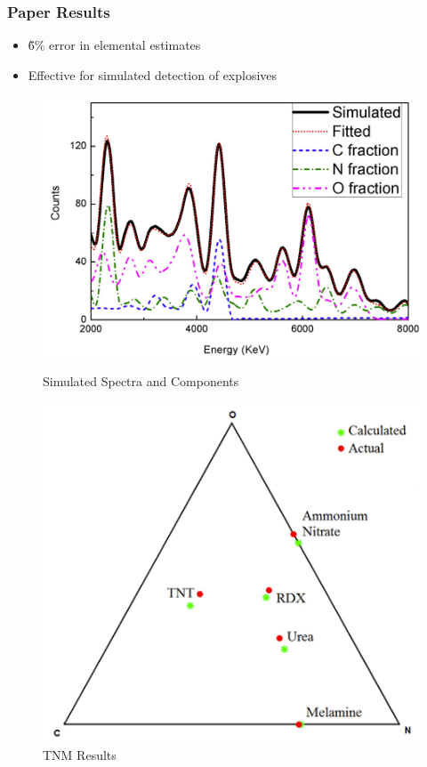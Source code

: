 \documentclass[xcolor=dvipsnames,envcountsect]{beamer}
\begin{document}
\begin{frame}
  \frametitle{Paper Results}
  \begin{itemize}
    \item \~6\% error in elemental estimates
    \item Effective for simulated detection of explosives
  \end{itemize}
  \begin{figure}
      \centering
      \begin{minipage}[b]{0.45\linewidth}
          \centering
          \includegraphics[width=\linewidth]{Figures/simulatedspectraanditscomponents.png}
          \caption{Simulated Spectra and Components}
          \label{fig:simulatedspectraanditscomponents}
      \end{minipage}
      \hfill
      \begin{minipage}[b]{0.45\linewidth}
          \centering
          \includegraphics[width=\linewidth]{Figures/tnmresults.png}
          \caption{TNM Results}
          \label{fig:tnmresults}
      \end{minipage}
  \end{figure}
\end{frame}
\end{document}
